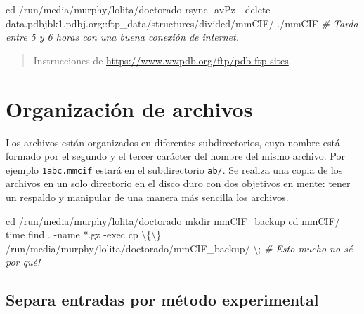 \documentclass[
]{book}
\newenvironment{Shaded}{\begin{snugshade}}{\end{snugshade}}
\newcommand{\AttributeTok}[1]{\textcolor[rgb]{0.77,0.63,0.00}{#1}}
\newcommand{\BuiltInTok}[1]{#1}
\newcommand{\CommentTok}[1]{\textcolor[rgb]{0.56,0.35,0.01}{\textit{#1}}}
\newcommand{\DataTypeTok}[1]{\textcolor[rgb]{0.13,0.29,0.53}{#1}}
\newcommand{\FunctionTok}[1]{\textcolor[rgb]{0.00,0.00,0.00}{#1}}
\newcommand{\NormalTok}[1]{#1}
\newcommand{\StringTok}[1]{\textcolor[rgb]{0.31,0.60,0.02}{#1}}
\theoremstyle{definition}
\theoremstyle{definition}
\theoremstyle{definition}
\theoremstyle{definition}
\theoremstyle{remark}
\begin{document}
\begin{Shaded}
\begin{Highlighting}[]
\BuiltInTok{cd}\NormalTok{ /run/media/murphy/lolita/doctorado}
\FunctionTok{rsync} \AttributeTok{{-}avPz} \AttributeTok{{-}{-}delete}\NormalTok{ data.pdbjbk1.pdbj.org::ftp\_data/structures/divided/mmCIF/ ./mmCIF}
\CommentTok{\# Tarda entre 5 y 6 horas con una buena conexión de internet.}
\end{Highlighting}
\end{Shaded}

\begin{quote}
Instrucciones de \url{https://www.wwpdb.org/ftp/pdb-ftp-sites}.
\end{quote}

\hypertarget{organizaciuxf3n-de-archivos}{%
\section{Organización de archivos}\label{organizaciuxf3n-de-archivos}}

Los archivos están organizados en diferentes subdirectorios, cuyo nombre está formado por el segundo y el tercer carácter del nombre del mismo archivo. Por ejemplo \texttt{1abc.mmcif} estará en el subdirectorio \texttt{ab/}. Se realiza una copia de los archivos en un solo directorio en el disco duro con dos objetivos en mente: tener un respaldo y manipular de una manera más sencilla los archivos.

\begin{Shaded}
\begin{Highlighting}[]
\BuiltInTok{cd}\NormalTok{ /run/media/murphy/lolita/doctorado}
\FunctionTok{mkdir}\NormalTok{ mmCIF\_backup}
\BuiltInTok{cd}\NormalTok{ mmCIF/}
\BuiltInTok{time}\NormalTok{ find . }\AttributeTok{{-}name} \StringTok{\textquotesingle{}*.gz\textquotesingle{}} \AttributeTok{{-}exec}\NormalTok{ cp }\DataTypeTok{\textbackslash{}\{\textbackslash{}\}}\NormalTok{ /run/media/murphy/lolita/doctorado/mmCIF\_backup/ }\DataTypeTok{\textbackslash{};} 
\CommentTok{\# Esto mucho no sé por qué! }
\end{Highlighting}
\end{Shaded}

\hypertarget{separa-entradas-por-muxe9todo-experimental}{%
\subsection{Separa entradas por método experimental}\label{separa-entradas-por-muxe9todo-experimental}}
\end{document}
